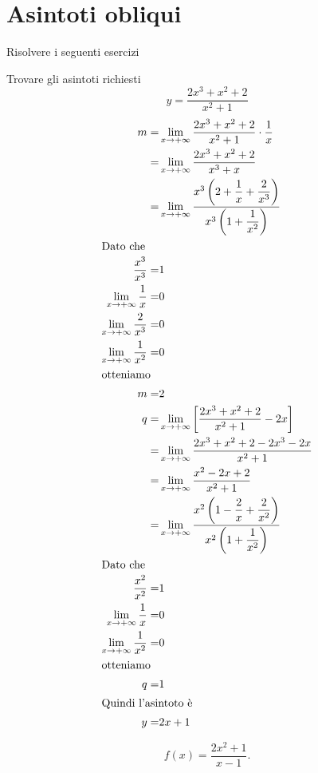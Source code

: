 \section{Asintoti obliqui}
Risolvere i seguenti esercizi
\begin{exercise}
	Trovare gli asintoti richiesti
	\[y=\dfrac{2x^3+x^2+2}{x^2+1}\]
	\tcblower
	\begin{align*}
	m=&\lim_{x\to +\infty}\dfrac{2x^3+x^2+2}{x^2+1}\cdot\dfrac{1}{x}\\
	=&\lim_{x\to +\infty}\dfrac{2x^3+x^2+2}{x^3+x}\\
	=&\lim_{x\to +\infty}\dfrac{x^3\left(2+\dfrac{1}{x}+\dfrac{2}{x^3}\right)}{x^3\left(1+\dfrac{1}{x^2}\right)}\\
	\intertext{Dato che}
	\dfrac{x^3}{x^3}=&1\\
	\lim_{x\to +\infty}\dfrac{1}{x}=&0\\
	\lim_{x\to +\infty}\dfrac{2}{x^3}=&0\\
	\lim_{x\to +\infty}\dfrac{1}{x^2}=&0\\
	\intertext{otteniamo}
	m=&2\\
	q=&\lim_{x\to +\infty}\left[\dfrac{2x^3+x^2+2}{x^2+1}-2x\right]\\
	=&\lim_{x\to +\infty}\dfrac{2x^3+x^2+2-2x^3-2x}{x^2+1}\\
	=&\lim_{x\to +\infty}\dfrac{x^2-2x+2}{x^2+1}\\
	=&\lim_{x\to +\infty}\dfrac{x^2\left(1-\dfrac{2}{x}+\dfrac{2}{x^2}\right)}{x^2\left(1+\dfrac{1}{x^2}\right)}\\
	\intertext{Dato che}
	\dfrac{x^2}{x^2}=&1\\
	\lim_{x\to +\infty}\dfrac{1}{x}=&0\\
	\lim_{x\to +\infty}\dfrac{1}{x^2}=&0\\
	\intertext{otteniamo}
	q=&1\\
	\intertext{Quindi l'asintoto è}
	y=&2x+1
	\end{align*}
\end{exercise}
\begin{exercise}[no solution]
	
	\begin{equation*}
	f(x)= \frac{2x^2+1}{x-1}.
	\end{equation*}
\end{exercise}
